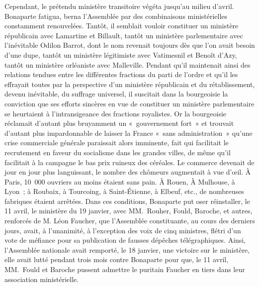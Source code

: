 \documentclass[french,twoside]{book} %
\begin{document}
Cependant, le prétendu ministère transitoire végéta jusqu’au milieu d’avril. Bonaparte fatigua, berna l’Assemblée par des combinaisons ministérielles constamment renouvelées. Tantôt, il semblait vouloir constituer un ministère républicain avec Lamartine et Billault, tantôt un ministère parlementaire avec l’inévitable Odilon Barrot, dont le nom revenait toujours dès que l’on avait besoin d’une dupe, tantôt un ministère légitimiste avec Vatimesnil et Benoît d’Azy, tantôt un ministère orléaniste avec Malleville. Pendant qu’il maintenait ainsi des relations tendues entre les différentes fractions du parti de l’ordre et qu’il les effrayait toutes par la perspective d’un ministère républicain et du rétablissement, devenu inévitable, du suffrage universel, il suscitait dans la bourgeoisie la conviction que ses efforts sincères en vue de constituer un ministère parlementaire se heurtaient à l’intransigeance des fractions royalistes. Or la bourgeoisie réclamait d’autant plus bruyamment un « gouvernement fort » et trouvait d’autant plus impardonnable de laisser la France « sans administration » qu’une crise commerciale générale paraissait alors imminente, fait qui facilitait le recrutement en faveur du socialisme dans les grandes villes, de même qu’il facilitait à la campagne le bas prix ruineux des céréales. Le commerce devenait de jour en jour plus languissant, le nombre des chômeurs augmentait à vue d’œil. À Paris, 10 000 ouvriers au moins étaient sans pain. À Rouen, À Mulhouse, à Lyon ; à Roubaix, à Tourcoing, à Saint-Étienne, à Elbeuf, etc., de nombreuses fabriques étaient arrêtées. Dans ces conditions, Bonaparte put oser réinstaller, le 11 avril, le ministère du 19 janvier, avec MM. Rouher, Fould, Baroche, et autres, renforcés de M. Léon Faucher, que l’Assemblée constituante, au cours des derniers jours, avait, à l’unanimité, à l’exception des voix de cinq ministres, flétri d’un vote de méfiance pour sa publication de fausses dépêches télégraphiques. Ainsi, l’Assemblée nationale avait remporté, le 18 janvier, une victoire sur le ministère, elle avait lutté pendant trois mois contre Bonaparte pour que, le 11 avril, MM. Fould et Baroche pussent admettre le puritain Faucher en tiers dans leur association ministérielle.\par
\end{document}
